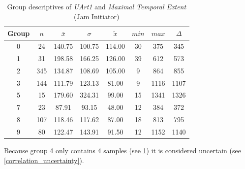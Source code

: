 \begin{table}[ht]
	\tiny
	\centering
    \begin{tabular}{c|c|c|c|c|c|c|c}
        \toprule
        Group & $n$ & $\bar{x}$ & $\sigma$ & $\tilde{x}$ & $min$ & $max$ & $\Delta$ \\
        \midrule
        0 & 24  & 140.75 & 100.75 & 114.00 & 30 & 375  & 345 \\ 
        1 & 31  & 198.58 & 166.25 & 126.00 & 39 & 612  & 573 \\ 
        2 & 345 & 134.87 & 108.69 & 105.00 & 9  & 864  & 855  \\ 
        3 & 144 & 111.79 & 123.13 & 81.00  & 9  & 1116 & 1107 \\ 
        5 & 15  & 179.60 & 324.31 & 99.00  & 15 & 1341 & 1326 \\ 
        7 & 23  & 87.91  & 93.15  & 48.00  & 12 & 384  & 372 \\ 
        8 & 107 & 118.46 & 117.62 & 87.00  & 18 & 813  & 795 \\ 
        9 & 80  & 122.47 & 143.91 & 91.50  & 12 & 1152 & 1140 \\ 
        \bottomrule
      \end{tabular}
    \caption{Group descriptives of \textit{UArt1} and \textit{Maximal Temporal Extent} (Jam Initiator)}
    \label{tbl:descriptives_baysis_initiator_UArt_TMax}
\end{table}
Because group 4 only contains 4 samples (see \cref{tbl:descriptives_baysis_initiator_UArt_TMax}) it is considered uncertain (see \cref{correlation_uncertainty}).


